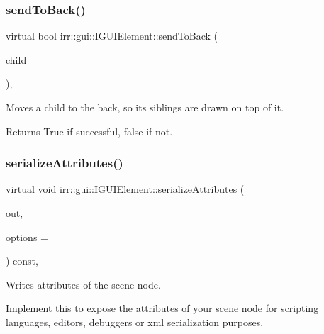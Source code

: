 \subsubsection{\texorpdfstring{send\+To\+Back()}{sendToBack()}}
{\footnotesize\ttfamily virtual bool irr\+::gui\+::\+I\+G\+U\+I\+Element\+::send\+To\+Back (\begin{DoxyParamCaption}\item[{\hyperlink{classirr_1_1gui_1_1IGUIElement}{I\+G\+U\+I\+Element} $\ast$}]{child }\end{DoxyParamCaption})\hspace{0.3cm}{\ttfamily [inline]}, {\ttfamily [virtual]}}



Moves a child to the back, so it\textquotesingle{}s siblings are drawn on top of it. 

\begin{DoxyReturn}{Returns}
True if successful, false if not. 
\end{DoxyReturn}
\mbox{\label{classirr_1_1gui_1_1IGUIElement_ac575f2f817b05733dbc667ff298f6e78}} 
\subsubsection{\texorpdfstring{serialize\+Attributes()}{serializeAttributes()}}
{\footnotesize\ttfamily virtual void irr\+::gui\+::\+I\+G\+U\+I\+Element\+::serialize\+Attributes (\begin{DoxyParamCaption}\item[{\hyperlink{classirr_1_1io_1_1IAttributes}{io\+::\+I\+Attributes} $\ast$}]{out,  }\item[{\hyperlink{structirr_1_1io_1_1SAttributeReadWriteOptions}{io\+::\+S\+Attribute\+Read\+Write\+Options} $\ast$}]{options = {} }\end{DoxyParamCaption}) const\hspace{0.3cm}{\ttfamily [inline]}, {\ttfamily [virtual]}}



Writes attributes of the scene node. 

Implement this to expose the attributes of your scene node for scripting languages, editors, debuggers or xml serialization purposes. 

